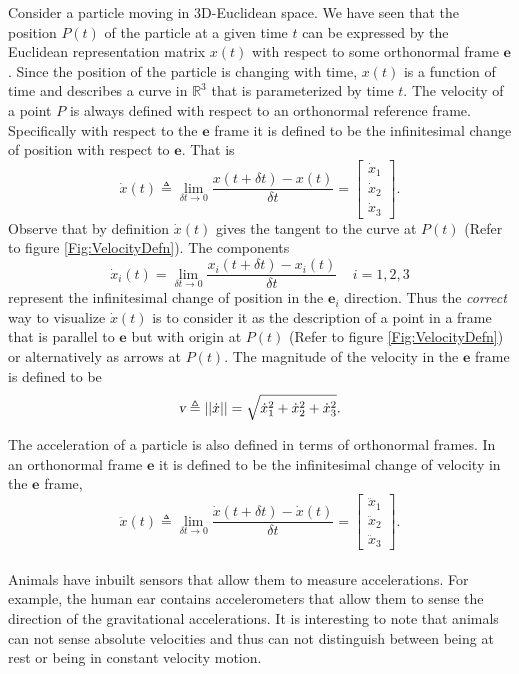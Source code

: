 \documentclass[graybox,envcountchap,sectrefs]{svmonoMuga}
\begin{document}
Consider a particle moving in 3D-Euclidean space. We have seen that the position $P(t)$ of the particle at a given time $t$ can be expressed by the Euclidean representation matrix $x(t)$ with respect to some orthonormal
frame $\mathbf{e}$. Since the position of the particle is changing with time, $x(t)$ is a function of time and describes a curve in $\mathbb{R}^3$ that is parameterized by time $t$.
The velocity of a point $P$ is always defined with respect to an orthonormal reference frame. 
Specifically 
with respect to the $\mathbf{e}$ frame it is defined to be the infinitesimal change of position with respect to $\mathbf{e}$. That is
\[
\dot{x}(t)\triangleq \lim_{\delta t \rightarrow 0}\frac{x(t+\delta t)-x(t)}{\delta t}=\left[\begin{array}{c} \dot{x}_1\\ \dot{x}_2\\ \dot{x}_3\end{array}\right].
\]
Observe that by definition $\dot{x}(t)$ gives the tangent to the curve at $P(t)$ (Refer to figure \ref{Fig:VelocityDefn}).
The components
\[
\dot{x}_i(t)=\lim_{\delta t \rightarrow 0}\frac{x_i(t+\delta t)-x_i(t)}{\delta t}\:\:\:\:\: i=1,2,3
\]
represent the infinitesimal change of position in the $\mathbf{e}_i$ direction.
Thus the \textit{correct} way to visualize $\dot{x}(t)$ is to consider it as the description of a point in a frame that is parallel to $\mathbf{e}$ but with origin at $P(t)$ (Refer to figure 
\ref{Fig:VelocityDefn}) or alternatively as arrows at $P(t)$.
The magnitude of the velocity in the $\mathbf{e}$ frame is defined to be
\[
\textsl{v}\triangleq||\dot{x}||=\sqrt{\dot{x}_1^2+\dot{x}_2^2+\dot{x}_3^2}.
\]



The acceleration of a particle is also defined in terms of orthonormal frames. In an orthonormal frame $\mathbf{e}$ it is defined to be the infinitesimal change of velocity in the $\mathbf{e}$ frame,
\[
\ddot{x}(t)\triangleq\lim_{\delta t \rightarrow 0}\frac{\dot{x}(t+\delta t)-\dot{x}(t)}{\delta t}=\left[\begin{array}{c} \ddot{x}_1\\ \ddot{x}_2\\ \ddot{x}_3\end{array}\right].
\]
\\
Animals have inbuilt sensors that allow them to measure accelerations. For example, the human ear contains accelerometers that allow them to sense the direction of the 
gravitational accelerations. It is interesting to note that animals can not sense absolute velocities and thus can not distinguish between being at rest or being in constant velocity motion.
\end{document}
